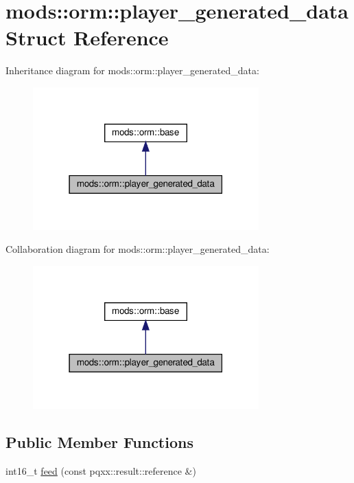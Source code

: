 \hypertarget{structmods_1_1orm_1_1player__generated__data}{}\section{mods\+:\+:orm\+:\+:player\+\_\+generated\+\_\+data Struct Reference}
\label{structmods_1_1orm_1_1player__generated__data}


Inheritance diagram for mods\+:\+:orm\+:\+:player\+\_\+generated\+\_\+data\+:
\nopagebreak
\begin{figure}[H]
\begin{center}
\leavevmode
\includegraphics[width=247pt]{structmods_1_1orm_1_1player__generated__data__inherit__graph}
\end{center}
\end{figure}


Collaboration diagram for mods\+:\+:orm\+:\+:player\+\_\+generated\+\_\+data\+:
\nopagebreak
\begin{figure}[H]
\begin{center}
\leavevmode
\includegraphics[width=247pt]{structmods_1_1orm_1_1player__generated__data__coll__graph}
\end{center}
\end{figure}
\subsection*{Public Member Functions}
\begin{DoxyCompactItemize}
\item 
int16\+\_\+t \hyperlink{structmods_1_1orm_1_1player__generated__data_ac6a622c219c6d50c3f054aef965e4363}{feed} (const pqxx\+::result\+::reference \&)
\end{DoxyCompactItemize}
